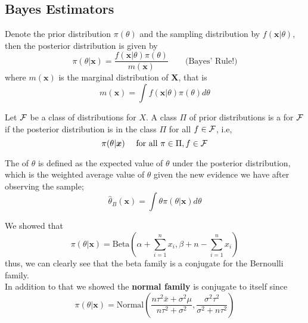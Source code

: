 \subsection{Bayes Estimators}
Denote the prior distribution $\pi(\theta)$ and the sampling distribution by $f(\boldsymbol{x}|\theta)$, then the posterior distribution is given by 
$$
\pi(\theta|\boldsymbol{x}) = \frac{f(\boldsymbol{x}|\theta)\pi(\theta)}{m(\boldsymbol{x})} \quad 
\quad \text{(Bayes' Rule!)}
$$
where $m(\boldsymbol{x})$ is the marginal distribution of $\boldsymbol{X}$, that is 
$$
    m(\boldsymbol{x}) = \int f(\boldsymbol{x}|\theta)\pi(\theta)d\theta
$$

\begin{definition}
    Let $\mathcal F$ be a class of distributions for $X$. A class $\Pi$ of prior distributions is a  for $\mathcal F$ if the posterior distribution is in the class $\Pi$ for all $f \in \mathcal F$, i.e,
    $$
    \pi(\theta|\boldsymbol{x})\quad \text{ for all } \pi \in \Pi, f \in \mathcal F
    $$
\end{definition}

The  of $\theta$ is defined as the expected value of $\theta$ under the posterior distribution, which is the weighted average value of $\theta$ given the new evidence we have after observing the sample;
$$
\hat{\theta}_{B}(\boldsymbol{x}) = \int \theta \pi (\theta|\boldsymbol{x})d\theta 
$$
\begin{example}
We showed that 
$$
    \pi(\theta|\boldsymbol{x}) = \text{Beta}
    \left(\alpha + \sum_{i=1}^{n}x_i, \beta + n - \sum_{i=1}^{n}x_i \right)
$$
thus, we can clearly see that the beta family is a conjugate for the Bernoulli family.
\\
In addition to that we showed the \textbf{normal family} is conjugate to itself since
$$
\pi(\theta|\boldsymbol{x}) = \text{Normal}
\left( 
\frac{n \tau^2 \bar{x} + \sigma^2 \mu}{n \tau^2 + \sigma^2},
\frac{\sigma^2 \tau^2}{\sigma^2 + n \tau^2}
\right )
$$
\end{example}
